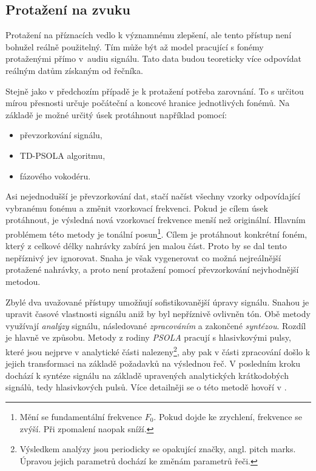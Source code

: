 \subsection{Protažení na zvuku}
\label{chap:realisation:augmentation:audio}

Protažení na příznacích vedlo k významnému zlepšení, ale tento přístup není bohužel reálně použitelný. Tím může být až model pracující s fonémy protaženými přímo v~audiu signálu. Tato data budou teoreticky více odpovídat reálným datům získaným od řečníka.

Stejně jako v předchozím případě je k protažení potřeba zarovnání. To s určitou mírou přesnosti určuje počáteční a koncové hranice jednotlivých fonémů. Na základě je možné určitý úsek protáhnout například pomocí:

\begin{itemize}
  \item převzorkování signálu,
  \item TD-PSOLA algoritmu,
  \item fázového vokodéru.
\end{itemize}

\noindent Asi nejednodušší je převzorkování dat, stačí načíst všechny vzorky odpovídající vybranému fonému a změnit vzorkovací frekvenci. Pokud je cílem úsek protáhnout, je výsledná nová vzorkovací frekvence menší než originální. Hlavním problémem této metody je tonální posun\footnote{Mění se fundamentální frekvence $F_0$. Pokud dojde ke zrychlení, frekvence se zvýší. Při zpomalení naopak sníží.}. Cílem je protáhnout konkrétní foném, který z celkové délky nahrávky zabírá jen malou část. Proto by se dal tento nepříznivý jev ignorovat. Snaha je však vygenerovat co možná nejreálnější protažené nahrávky, a proto není protažení pomocí převzorkování nejvhodnější metodou.

Zbylé dva uvažované přístupy umožňují sofistikovanější úpravy signálu. Snahou je upravit časové vlastnosti signálu aniž by byl nepříznivě ovlivněn tón.  Obě metody využívají \textit{analýzy} signálu, následované \textit{zpracováním} a zakončené \textit{syntézou}. Rozdíl je hlavně ve způsobu. Metody z rodiny \textit{PSOLA} pracují s hlasivkovými pulsy, které jsou nejprve v analytické části nalezeny\footnote{Výsledkem analýzy jsou periodicky se opakující značky, angl. pitch marks. Úpravou jejich parametrů dochází ke změnám parametrů řeči.}, aby pak v části zpracování došlo k jejich transformaci na základě požadavků na výslednou řeč. V posledním kroku dochází k syntéze signálu na základě upravených analytických krátkodobých signálů, tedy hlasivkových pulsů. Více detailněji se o této metodě hovoří v \cite{Psutka2006}.

